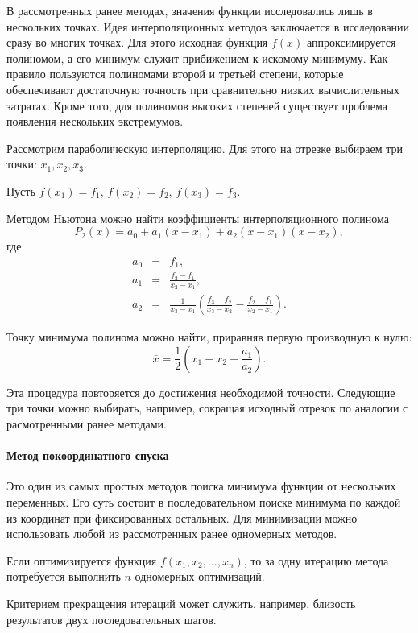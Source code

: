 В рассмотренных ранее методах, значения функции исследовались лишь
в нескольких точках. Идея интерполяционных методов заключается в исследовании
сразу во многих точках. Для этого исходная функция $f(x)$ аппроксимируется
полиномом, а его минимум служит прибижением к искомому минимуму. Как
правило пользуются полиномами второй и третьей степени, которые обеспечивают
достаточную точность при сравнительно низких вычислительных затратах.
Кроме того, для полиномов высоких степеней существует проблема появления
нескольких экстремумов.

Рассмотрим параболическую интерполяцию. Для этого на отрезке выбираем
три точки: $x_{1},x_{2},x_{3}.$

Пусть $f(x_{1})=f_{1}$, $f(x_{2})=f_{2}$, $f(x_{3})=f_{3}$.

Методом Ньютона можно найти коэффициенты интерполяционного полинома
\[
P_{2}(x)=a_{0}+a_{1}(x-x_{1})+a_{2}(x-x_{1})(x-x_{2}),
\]
где
\begin{eqnarray*}
a_{0} & = & f_{1},\\
a_{1} & = & \frac{f_{2}-f_{1}}{x_{2}-x_{1}},\\
a_{2} & = & \frac{1}{x_{3}-x_{1}}\left(\frac{f_{3}-f_{2}}{x_{3}-x_{2}}-\frac{f_{2}-f_{1}}{x_{2}-x_{1}}\right).
\end{eqnarray*}


Точку минимума полинома можно найти, приравняв первую производную
к нулю:
\[
\bar{x}=\frac{1}{2}(x_{1}+x_{2}-\frac{a_{1}}{a_{2}}).
\]


Эта процедура повторяется до достижения необходимой точности. Следующие
три точки можно выбирать, например, сокращая исходный отрезок по аналогии
с расмотренными ранее методами.




\paragraph{Метод покоординатного спуска}

Это один из самых простых методов поиска минимума функции от нескольких
переменных. Его суть состоит в последовательном поиске минимума по
каждой из координат при фиксированных остальных. Для минимизации можно
использовать любой из рассмотренных ранее одномерных методов.

Если оптимизируется функция $f(x_{1},x_{2},\dots,x_{n})$, то за одну
итерацию метода потребуется выполнить $n$ одномерных оптимизаций.

Критерием прекращения итераций может служить, например, близость результатов
двух последовательных шагов.


